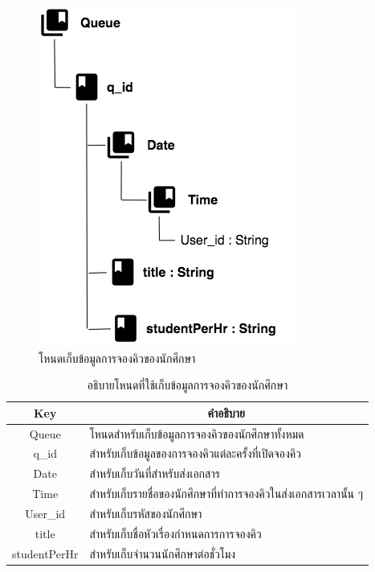 \newpage
\begin{figure}[H]
	\centering
	\includegraphics[width=0.5\columnwidth]
	{Figures/3/DB/nodeQueue}
	\caption{โหนดเก็บข้อมูลการจองคิวของนักศึกษา}
	\label{Fig:DB4}
\end{figure}
\begin{table}[H]
	\centering
	\caption{อธิบายโหนดที่ใช้เก็บข้อมูลการจองคิวของนักศึกษา}
	\label{my-label1}
	\begin{tabular}{|c|p{10cm}|}
		\hline
		\multicolumn{1}{|c|}{\textbf{Key}} & \multicolumn{1}{c|}{\textbf{คำอธิบาย}} \\ \hline
		Queue & โหนดสำหรับเก็บข้อมูลการจองคิวของนักศึกษาทั้งหมด \\ \hline
		q\_id &  สำหรับเก็บข้อมูลของการจองคิวแต่ละครั้งที่เปิดจองคิว \\ \hline
		Date &  สำหรับเก็บวันที่สำหรับส่งเอกสาร\\ \hline
		Time &  สำหรับเก็บรายชื่อของนักศึกษาที่ทำการจองคิวในส่งเอกสารเวลานั้น ๆ\\ \hline
		User\_id & สำหรับเก็บรหัสของนักศึกษา \\ \hline
		title & สำหรับเก็บชื่อหัวเรื่องกำหนดการการจองคิว \\ \hline
		studentPerHr & สำหรับเก็บจำนวนนักศึกษาต่อชั่วโมง \\ \hline
	\end{tabular}
\end{table}

